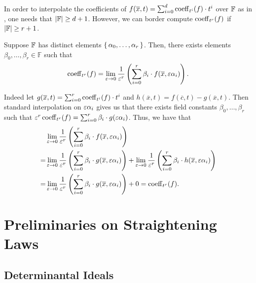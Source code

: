 \documentclass[letterpaper, 11pt]{amsart}
\begin{document}
\begin{ex}[{\cite{DL25}}]
  In order to interpolate the coefficients of $f(\overline{x}, t) = \sum_{i = 0}^d \operatorname{coeff}_{t^i}(f) \cdot t^i$ over $\mathbb{F}$ as in , one needs that $\abs{\mathbb{F}} \geq d + 1$.
  However, we can border compute $\operatorname{coeff}_{t^r}(f)$ if $\abs{\mathbb{F}} \geq r + 1$.

  Suppose $\mathbb{F}$ has distinct elements $\set{\alpha_0, \ldots, \alpha_r}$.
  Then, there exists elements $\beta_0, \ldots, \beta_r \in \mathbb{F}$ such that
  \[
    \operatorname{coeff}_{t^r}(f) = \lim_{\varepsilon \to 0} \frac{1}{\varepsilon^r} \left( \sum_{i = 0}^r \beta_i \cdot f(\overline{x}, \varepsilon \alpha_i) \right).
  \]

  Indeed let $g(\overline{x}, t) = \sum_{i = 0}^r \operatorname{coeff}_{t^i}(f) \cdot t^i$ and $h(\overline{x}, t) = f(\overline{c}, t) - g(\overline{x}, t)$.
  Then standard interpolation on $\varepsilon \alpha_i$ gives us that there exists field constants $\beta_0, \ldots, \beta_r$ such that $\varepsilon^r \operatorname{coeff}_{t^r}(f) = \sum_{i = 0}^r \beta_i \cdot g(\varepsilon \alpha_i)$.
  Thus, we have that
  \begin{align*}
    & \lim_{\varepsilon \to 0} \frac{1}{\varepsilon^r} \left( \sum_{i = 0}^r \beta_i \cdot f(\overline{x}, \varepsilon \alpha_i) \right) \\
    =& \lim_{\varepsilon \to 0} \frac{1}{\varepsilon^r} \left( \sum_{i = 0}^r \beta_i \cdot g(\overline{x}, \varepsilon \alpha_i) \right) + \lim_{\varepsilon \to 0} \frac{1}{\varepsilon^r} \left( \sum_{i = 0}^r \beta_i \cdot h(\overline{x}, \varepsilon \alpha_i) \right) \\=& \lim_{\varepsilon \to 0} \frac{1}{\varepsilon^r} \left( \sum_{i = 0}^r \beta_i \cdot g(\overline{x}, \varepsilon \alpha_i) \right) + 0 = \operatorname{coeff}_{t^r}(f).
  \end{align*}
\end{ex}
\fi

\section{Preliminaries on Straightening Laws}

\subsection{Determinantal Ideals}
\end{document}
